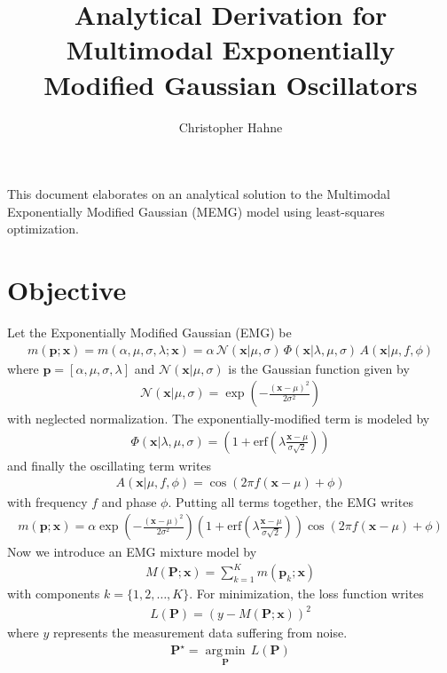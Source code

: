 \documentclass{article}
\title{Analytical Derivation for Multimodal Exponentially Modified Gaussian Oscillators}
\author{Christopher Hahne}
\begin{document}
\maketitle

This document elaborates on an analytical solution to the Multimodal Exponentially Modified Gaussian (MEMG) model using least-squares optimization.

\section{Objective}
Let the Exponentially Modified Gaussian (EMG) be
\begin{align}
m(\mathbf{p}; \mathbf{x})=m(\alpha, \mu, \sigma,\lambda;\mathbf{x})= \alpha\,\mathcal{N}(\mathbf{x}|\mu,\sigma) \, \Phi(\mathbf{x}|\lambda,\mu,\sigma) \, A(\mathbf{x}|\mu,f,\phi)
\end{align}
where $\mathbf{p}=\left[\alpha,\mu,\sigma,\lambda\right]$ and $\mathcal{N}(\mathbf{x}|\mu,\sigma)$ is the Gaussian function given by
\begin{align}
\mathcal{N}(\mathbf{x}|\mu,\sigma)=%
\exp\left(-\frac{\left(\mathbf{x}-\mu\right)^2}{2\sigma^2}\right)
\end{align}
with neglected normalization. The exponentially-modified term is modeled by
\begin{align}
\Phi(\mathbf{x}|\lambda,\mu,\sigma)=\left(1+ \text{erf}\left(\lambda\frac{\mathbf{x}-\mu}{\sigma\sqrt{2}}\right)\right)
\end{align}
and finally the oscillating term writes
\begin{align}
A(\mathbf{x}|\mu,f,\phi) = \cos\left(2 \pi f \left(\mathbf{x} - \mu\right) + \phi\right)
\end{align}
with frequency $f$ and phase $\phi$. Putting all terms together, the EMG writes
\begin{align}
m(\mathbf{p};\mathbf{x})=\alpha %
\exp\left(-\frac{\left(\mathbf{x}-\mu\right)^2}{2\sigma^2}\right) \left(1 + \text{erf}\left(\lambda\frac{\mathbf{x}-\mu}{\sigma\sqrt{2}}\right)\right) \cos\left(2 \pi f \left(\mathbf{x} - \mu\right) + \phi\right)
\end{align}
Now we introduce an EMG mixture model by
\begin{align}
M\left(\mathbf{P};\mathbf{x}\right)=\sum_{k=1}^K m\left(\mathbf{p}_k;\mathbf{x}\right)
\end{align}
with components $k=\{1,2,\dots,K\}$. For minimization, the loss function writes
\begin{align}
L\left(\mathbf{P}\right)=\left(y-M\left(\mathbf{P};\mathbf{x}\right)\right)^2
\end{align}
where $y$ represents the measurement data suffering from noise.
\begin{align}
\mathbf{P}^\star=\underset{\mathbf{P}}{\operatorname{arg\,min}} \, L\left(\mathbf{P}\right)
\end{align}
\end{document}
